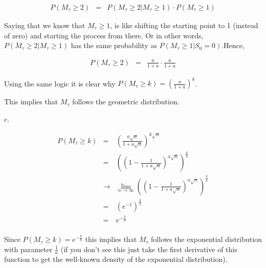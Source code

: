 \documentclass[10pt,a4paper]{article}
\begin{document}
\begin{flushleft}
\begin{eqnarray*}
P(M_\tau \geq 2)&=& P(M_\tau \geq 2|M_\tau \geq 1)\cdot P(M_\tau
\geq 1)
\end{eqnarray*}

Saying that we know that $M_\tau \geq 1$,  is like shifting the
starting point to 1 (instead of zero) and starting the process
from there. Or in other words, $P(M_\tau \geq 2|M_\tau \geq 1)$
has the same probability as $P(M_\tau \geq 1|S_0=0)$.Hence,


\begin{eqnarray*}
P(M_\tau \geq 2)&=& \frac{a}{1+a} \cdot \frac{a}{1+a}
\end{eqnarray*}


Using the same logic it is clear why $P(M_\tau \geq
k)=(\frac{a}{1+a})^k$.

This implies that $M_\tau$ follows the geometric distribution.

c.

\begin{eqnarray*}
P(M_\tau \geq k)&=&(\frac{a\sqrt{n}}{1+a\sqrt{n}})^{k\sqrt{n}}\\
&=&((1-\frac{1}{1+a\sqrt{n}})^{a\sqrt{n}})^{\frac{k}{a}}\\
&\rightarrow& \lim_{n\rightarrow \infty}
((1-\frac{1}{1+a\sqrt{n}})^{a\sqrt{n}})^{\frac{k}{a}}\\
&=& (e^{-1})^{\frac{k}{a}}\\
&=& e^{-\frac{k}{a}}\\
\end{eqnarray*}


Since $P(M_\tau \geq k)=e^{-\frac{k}{a}}$ this implies that
$M_\tau$ follows the exponential distribution with parameter
$\frac{1}{a}$ (if you don't see this just take the first
derivative of this function to get the well-known density of the
exponential distribution).
\end{flushleft}
\end{document}
